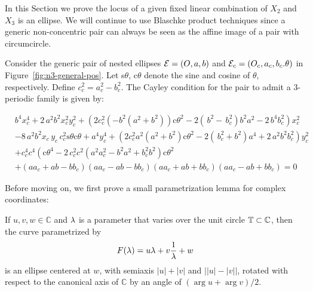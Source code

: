 In this Section we prove the locus of a given fixed linear combination of $X_2$ and $X_3$ is an ellipse. We will continue to use Blaschke product techniques since a generic non-concentric pair can always be seen as the affine image of a pair with circumcircle.

Consider the generic pair of nested ellipses $\mathcal{E}=(O,a,b)$ and $\mathcal{E}_c=(O_c,a_c,b_c.\theta)$ in Figure~\ref{fig:n3-general-pos}. Let s$\theta$, c$\theta$ denote the sine and cosine of $\theta$, respectively. Define $c_c^2=a_c^2-b_c^2$. The Cayley condition for the pair to admit a 3-periodic family is given by:

{\small
\begin{align}
&{b}^{4}x_c^{4}+2\,{a}^{2}{b}^{2}x_c^{2}y_c^{2}+
 \left(  2 c_c^2  \left( -{b}^{2}({a}^{2}+{b}^{2} )\right)  \text{c}\theta^2  - 2\left(  \,b ^{2}- \,b_c
^{2} \right) {b}^{2}{a}^{2}-2\,{b}^{4}b_c^{2} \right)x_c
^{2} \label{eqn:cayley}\\
&-8\,{a}^{2}{b}^{2}x_c\,{  y_c}\,c_c^2 
\text{s}\theta\text{c}\theta  +{a}^{4}y_c^{4} + \left(  2 c_c^2 a^2 \left(
{a}^{2}+{b}^{2}  \right)\text{c}\theta^2  
 -2 \left(  \,b_c^{2}+{b}^{2} \right) {a}^{4}+2
\,{a}^{2}{b}^{2}b_c^{2} \right) y_c^{2} \nonumber\\
&+ c_c^4  c^4  \left( \text{c}\theta^4-2\, c_c^2 c^2
  \left( {a}^{2} a_c^{2}-{b}^{2}{a}^{2}+
b_c^{2}{b}^{2} \right) \text{c}\theta^2 \right. \nonumber\\
 &+ \left( a a_c+a b-b b_c \right)  \left( a a_c
-a b -b b_c \right)  \left( a a_c+a b+b b_c \right)  \left( a
a_c-a b+b b_c \right) = 0\nonumber
\end{align}
}


 
Before moving on, we first prove a small parametrization lemma for complex coordinates:

\begin{lemma}
If $u,v,w\in\mathbb{C}$ and $\lambda$ is a parameter that varies over the unit circle $\mathbb{T}\subset\mathbb{C}$, then the curve parametrized by
\[ F(\lambda)=u \lambda+v\frac{1}{\lambda}+w \]
is an ellipse centered at $w$, with semiaxis $|u|+|v|$ and $\big||u|-|v|\big|$, rotated with respect to the canonical axis of $\mathbb{C}$ by an angle of $(\arg u+\arg v)/2$.
\label{lem:ell-param}
\end{lemma}

